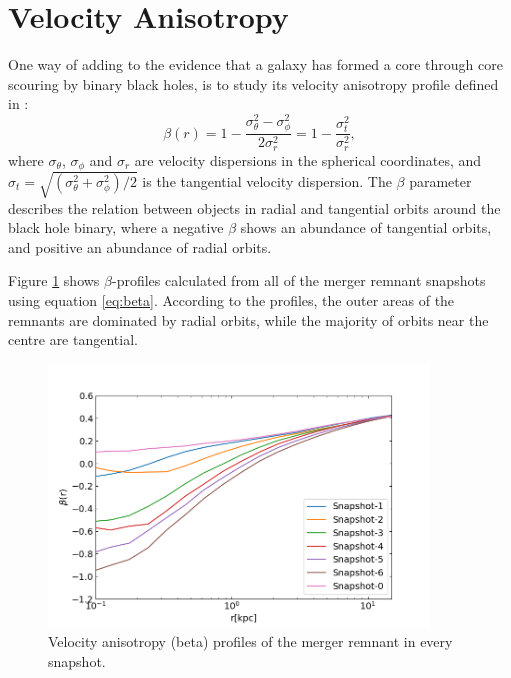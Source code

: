\documentclass[english, oneside]{HYgradu}
\begin{document}
\section{Velocity Anisotropy}


One way of adding to the evidence that a galaxy has formed a core through core scouring by binary black holes, is to study its velocity anisotropy profile defined in \cite{BinneyTremaine}:
\begin{equation}
\beta(r) = 1 - \frac{\sigma_\theta^2 - \sigma_\phi^2}{2\sigma_r^2} = 1 - \frac{\sigma_t^2}{\sigma_r^2}, \label{eq:beta}
\end{equation}
where $\sigma_\theta$, $\sigma_\phi$ and $\sigma_r$ are velocity dispersions in the spherical coordinates, and $\sigma_t = \sqrt{(\sigma_\theta^2 + \sigma_\phi^2) / 2}$ is the tangential velocity dispersion. The $\beta$ parameter describes the relation between objects in radial and tangential orbits around the black hole binary, where a negative $\beta$ shows an abundance of tangential orbits, and positive an abundance of radial orbits. 

Figure \ref{figure:beta_no_rb} shows $\beta$-profiles calculated from all of the merger remnant snapshots using equation \ref{eq:beta}. According to the profiles, the outer areas of the remnants are dominated by radial orbits, while the majority of orbits near the centre are tangential.

\begin{figure}[h]
	\centering
	\includegraphics[width=0.9\textwidth]{beta_no_rb.png}
	\caption{Velocity anisotropy (beta) profiles of the merger remnant in every snapshot.}
	\label{figure:beta_no_rb}
\end{figure}
\end{document}
